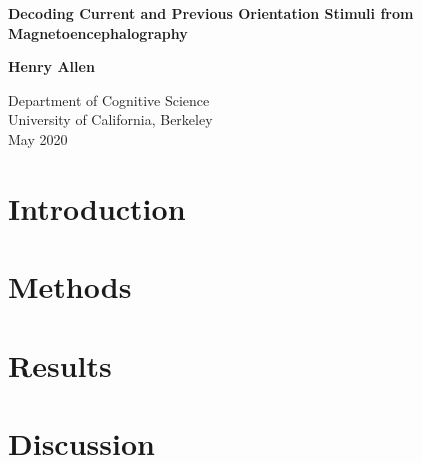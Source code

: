 \documentclass[letterpaper, 12pt, man]{article}
\begin{document}
\begin{titlepage}
   \begin{center}
       \vspace*{1cm}

       \Huge
       \textbf{Decoding Current and Previous Orientation Stimuli from Magnetoencephalography}

       \vspace{0.5cm}

       \Large    
       \vspace{1.5cm}

       \textbf{Henry Allen}

       \vfill
            


            
       \vspace{0.8cm}
     

       \Large            
       Department of Cognitive Science\\
       University of California, Berkeley\\
       May 2020
       
            
   \end{center}
\end{titlepage}

\abstract{
  
}



\section{Introduction}


\section{Methods}


\section{Results}


\section{Discussion}



\end{document}
